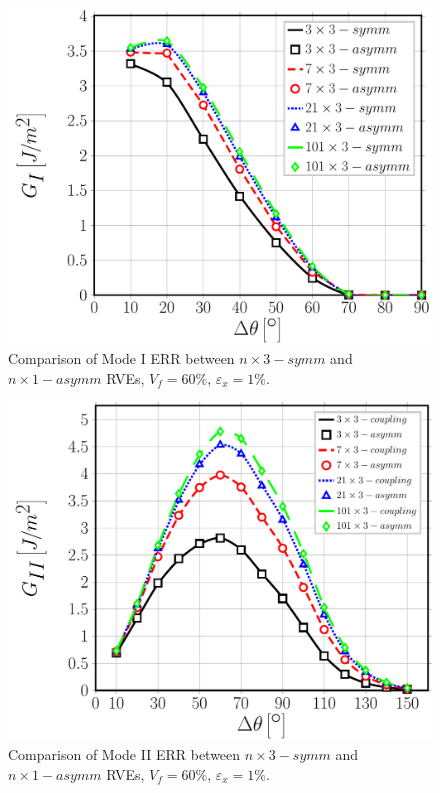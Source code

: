 \begin{figure}[!htb]
\centering
  \includegraphics[width=\textwidth]{paperD/nxk-coupling-vf60-GI.pdf}
\caption{Comparison of Mode I ERR between $n \times 3-symm$ and $n \times 1-asymm$ RVEs, $V_{f}=60\%$, $\varepsilon_{x}=1\%$.}\label{chap3:paperD:fig:nxk-GI}
\end{figure}

\begin{figure}[!htb]
\centering
  \includegraphics[width=\textwidth]{paperD/nxk-coupling-vf60-GII.pdf}
\caption{Comparison of Mode II ERR between $n \times 3-symm$ and $n \times 1-asymm$ RVEs, $V_{f}=60\%$, $\varepsilon_{x}=1\%$.}\label{chap3:paperD:fig:nxk-GII}
\end{figure}

